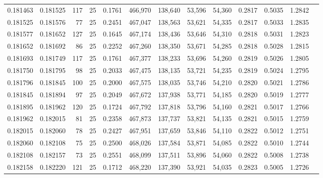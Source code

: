 \begin{tabular}{rrrrrrrrrrrrr}
0.181463 & 0.181525 &   117 &  25 &                                     0.1761 & 466,970 & 138,640 &  53,596 &  54,360 & 0.2817 & 0.5035 & 1.2842 \\
0.181525 & 0.181576 &    77 &  25 &                                     0.2451 & 467,047 & 138,563 &  53,621 &  54,335 & 0.2817 & 0.5033 & 1.2835 \\
0.181577 & 0.181652 &   127 &  25 &                                     0.1645 & 467,174 & 138,436 &  53,646 &  54,310 & 0.2818 & 0.5031 & 1.2823 \\
0.181652 & 0.181692 &    86 &  25 &                                     0.2252 & 467,260 & 138,350 &  53,671 &  54,285 & 0.2818 & 0.5028 & 1.2815 \\
0.181693 & 0.181749 &   117 &  25 &                                     0.1761 & 467,377 & 138,233 &  53,696 &  54,260 & 0.2819 & 0.5026 & 1.2805 \\
0.181750 & 0.181795 &    98 &  25 &                                     0.2033 & 467,475 & 138,135 &  53,721 &  54,235 & 0.2819 & 0.5024 & 1.2795 \\
0.181796 & 0.181845 &   100 &  25 &                                     0.2000 & 467,575 & 138,035 &  53,746 &  54,210 & 0.2820 & 0.5021 & 1.2786 \\
0.181845 & 0.181894 &    97 &  25 &                                     0.2049 & 467,672 & 137,938 &  53,771 &  54,185 & 0.2820 & 0.5019 & 1.2777 \\
0.181895 & 0.181962 &   120 &  25 &                                     0.1724 & 467,792 & 137,818 &  53,796 &  54,160 & 0.2821 & 0.5017 & 1.2766 \\
0.181962 & 0.182015 &    81 &  25 &                                     0.2358 & 467,873 & 137,737 &  53,821 &  54,135 & 0.2821 & 0.5015 & 1.2759 \\
0.182015 & 0.182060 &    78 &  25 &                                     0.2427 & 467,951 & 137,659 &  53,846 &  54,110 & 0.2822 & 0.5012 & 1.2751 \\
0.182060 & 0.182108 &    75 &  25 &                                     0.2500 & 468,026 & 137,584 &  53,871 &  54,085 & 0.2822 & 0.5010 & 1.2744 \\
0.182108 & 0.182157 &    73 &  25 &                                     0.2551 & 468,099 & 137,511 &  53,896 &  54,060 & 0.2822 & 0.5008 & 1.2738 \\
0.182158 & 0.182220 &   121 &  25 &                                     0.1712 & 468,220 & 137,390 &  53,921 &  54,035 & 0.2823 & 0.5005 & 1.2726 \\

\end{tabular}
